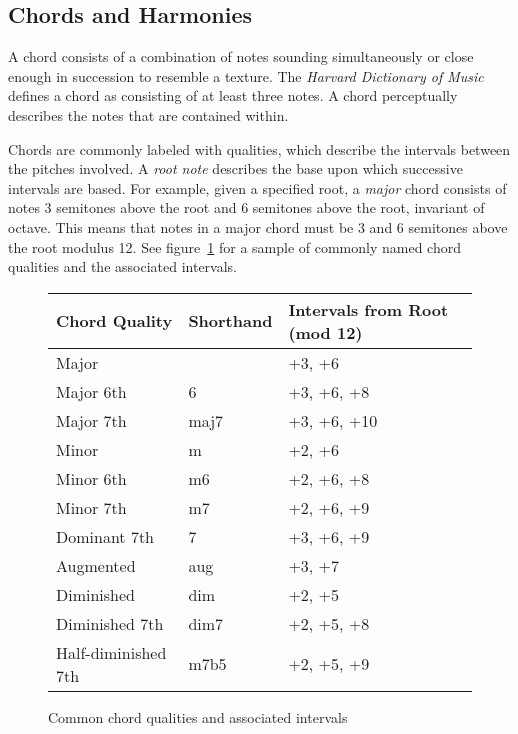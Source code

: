 \subsection{Chords and Harmonies}

A chord consists of a combination of notes sounding simultaneously or close enough in succession to resemble a texture. The \textit{Harvard Dictionary of Music} defines a chord as consisting of at least three notes\cite{harvdict}. A chord perceptually describes the notes that are contained within.

Chords are commonly labeled with qualities, which describe the intervals between the pitches involved. A \textit{root note} describes the base upon which successive intervals are based. For example, given a specified root, a \textit{major} chord consists of notes 3 semitones above the root and 6 semitones above the root, invariant of octave. This means that notes in a major chord must be 3 and 6 semitones above the root modulus 12. See figure~\ref{fig:qualitytable} for a sample of commonly named chord qualities and the associated intervals.

\begin{figure}[h!]
\begin{center}
\begin{tabular}{lll}
\toprule
Chord Quality       & Shorthand & Intervals from Root (mod 12) \\
\midrule
Major               &           & +3, +6     \\
Major 6th           & 6         & +3, +6, +8 \\
Major 7th           & maj7      & +3, +6, +10\\
Minor               & m         & +2, +6     \\
Minor 6th           & m6        & +2, +6, +8 \\
Minor 7th           & m7        & +2, +6, +9 \\
Dominant 7th        & 7         & +3, +6, +9 \\
Augmented           & aug       & +3, +7     \\
Diminished          & dim       & +2, +5     \\
Diminished 7th      & dim7      & +2, +5, +8 \\
Half-diminished 7th & m7b5      & +2, +5, +9 \\
\bottomrule
\end{tabular}
\caption{Common chord qualities and associated intervals}
\label{fig:qualitytable}
\end{center}
\end{figure}


